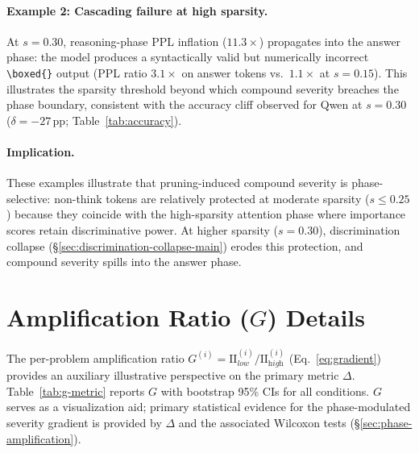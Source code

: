 \paragraph{Example 2: Cascading failure at high sparsity.}
At $s{=}0.30$, reasoning-phase PPL inflation ($11.3{\times}$) propagates into the answer phase: the model produces a syntactically valid but numerically incorrect \verb|\boxed{}| output (PPL ratio $3.1{\times}$ on answer tokens vs.\ $1.1{\times}$ at $s{=}0.15$). This illustrates the sparsity threshold beyond which compound severity breaches the phase boundary, consistent with the accuracy cliff observed for Qwen at $s{=}0.30$ ($\delta{=}-27$\,pp; Table~\ref{tab:accuracy}).

\paragraph{Implication.}
These examples illustrate that pruning-induced compound severity is phase-selective: non-think tokens are relatively protected at moderate sparsity ($s \leq 0.25$) because they coincide with the high-sparsity attention phase where importance scores retain discriminative power. At higher sparsity ($s{=}0.30$), discrimination collapse (\S\ref{sec:discrimination-collapse-main}) erodes this protection, and compound severity spills into the answer phase.


\section{Amplification Ratio ($G$) Details}
\label{app:g-metric}

The per-problem amplification ratio $G^{(i)} = \mathrm{II}^{(i)}_{\textit{low}} / \mathrm{II}^{(i)}_{\textit{high}}$ (Eq.~\ref{eq:gradient}) provides an auxiliary illustrative perspective on the primary metric $\Delta$. Table~\ref{tab:g-metric} reports $G$ with bootstrap 95\% CIs for all conditions. $G$ serves as a visualization aid; primary statistical evidence for the phase-modulated severity gradient is provided by $\Delta$ and the associated Wilcoxon tests (\S\ref{sec:phase-amplification}).

